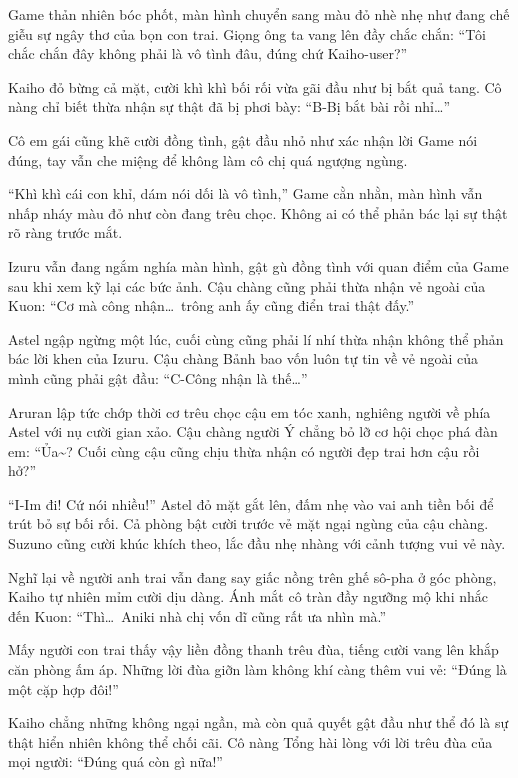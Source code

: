 \documentclass[../main.tex]{subfiles}
\begin{document}
Game thản nhiên bóc phốt, màn hình chuyển sang màu đỏ nhè nhẹ như đang chế giễu sự ngây thơ của bọn con trai. Giọng ông ta vang lên đầy chắc chắn: ``Tôi chắc chắn đây không phải là vô tình đâu, đúng chứ Kaiho-user?''

Kaiho đỏ bừng cả mặt, cười khì khì bối rối vừa gãi đầu như bị bắt quả tang. Cô nàng chỉ biết thừa nhận sự thật đã bị phơi bày: ``B-Bị bắt bài rồi nhỉ\dots''

Cô em gái cũng khẽ cười đồng tình, gật đầu nhỏ như xác nhận lời Game nói đúng, tay vẫn che miệng để không làm cô chị quá ngượng ngùng.

``Khì khì cái con khỉ, dám nói dối là vô tình,'' Game cằn nhằn, màn hình vẫn nhấp nháy màu đỏ như còn đang trêu chọc. Không ai có thể phản bác lại sự thật rõ ràng trước mắt.

Izuru vẫn đang ngắm nghía màn hình, gật gù đồng tình với quan điểm của Game sau khi xem kỹ lại các bức ảnh. Cậu chàng cũng phải thừa nhận vẻ ngoài của Kuon: ``Cơ mà công nhận\dots\ trông anh ấy cũng điển trai thật đấy.''

Astel ngập ngừng một lúc, cuối cùng cũng phải lí nhí thừa nhận không thể phản bác lời khen của Izuru. Cậu chàng Bảnh bao vốn luôn tự tin về vẻ ngoài của mình cũng phải gật đầu: ``C-Công nhận là thế\dots''

Aruran lập tức chớp thời cơ trêu chọc cậu em tóc xanh, nghiêng người về phía Astel với nụ cười gian xảo. Cậu chàng người Ý chẳng bỏ lỡ cơ hội chọc phá đàn em: ``Ủa\~{}? Cuối cùng cậu cũng chịu thừa nhận có người đẹp trai hơn cậu rồi hở?''

``I-Im đi! Cứ nói nhiều!'' Astel đỏ mặt gắt lên, đấm nhẹ vào vai anh tiền bối để trút bỏ sự bối rối. Cả phòng bật cười trước vẻ mặt ngại ngùng của cậu chàng. Suzuno cũng cười khúc khích theo, lắc đầu nhẹ nhàng với cảnh tượng vui vẻ này.

Nghĩ lại về người anh trai vẫn đang say giấc nồng trên ghế sô-pha ở góc phòng, Kaiho tự nhiên mỉm cười dịu dàng. Ánh mắt cô tràn đầy ngưỡng mộ khi nhắc đến Kuon: ``Thì\dots\ Aniki nhà chị vốn dĩ cũng rất ưa nhìn mà.''

Mấy người con trai thấy vậy liền đồng thanh trêu đùa, tiếng cười vang lên khắp căn phòng ấm áp. Những lời đùa giỡn làm không khí càng thêm vui vẻ: ``Đúng là một cặp hợp đôi!''

Kaiho chẳng những không ngại ngần, mà còn quả quyết gật đầu như thể đó là sự thật hiển nhiên không thể chối cãi. Cô nàng Tổng hài lòng với lời trêu đùa của mọi người: ``Đúng quá còn gì nữa!''
\end{document}
